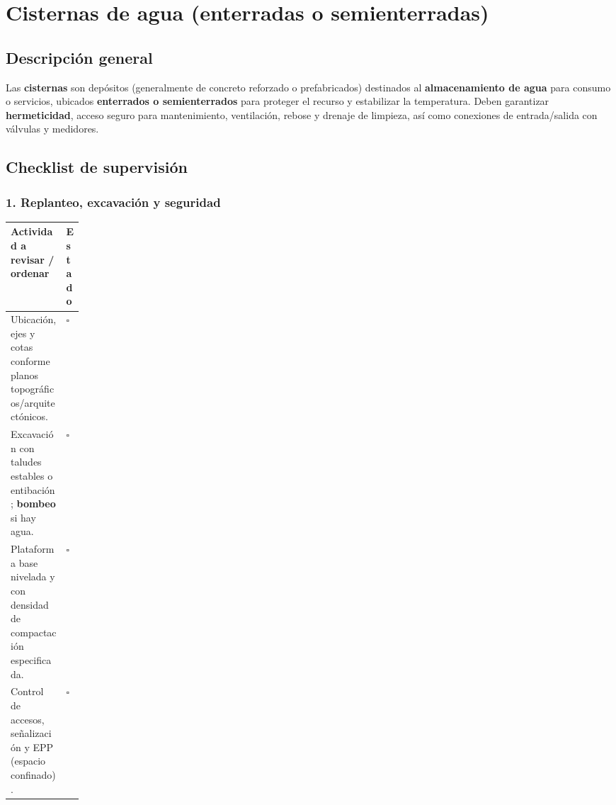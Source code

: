 \documentclass[12pt]{article}
\newcommand{\cbox}{\(\square\)} %
\begin{document}
	
	
	
	
	
	\section{Cisternas de agua (enterradas o semienterradas)}
	
	\subsection*{Descripción general}
	Las \textbf{cisternas} son depósitos (generalmente de concreto reforzado o prefabricados) destinados al \textbf{almacenamiento de agua} para consumo o servicios, ubicados \textbf{enterrados o semienterrados} para proteger el recurso y estabilizar la temperatura. Deben garantizar \textbf{hermeticidad}, acceso seguro para mantenimiento, ventilación, rebose y drenaje de limpieza, así como conexiones de entrada/salida con válvulas y medidores.
	
	
	
	\subsection{Checklist de supervisión}
	
	\renewcommand{\arraystretch}{1.2}
	\small
	
	\subsubsection*{1. Replanteo, excavación y seguridad}
	\begin{tabularx}{\linewidth}{
			>{\raggedright\arraybackslash}X
			>{\centering\arraybackslash}p{0.12\linewidth}
		}
		\toprule
		\textbf{Actividad a revisar / ordenar} & \textbf{Estado}\\
		\midrule
		Ubicación, ejes y cotas conforme planos topográficos/arquitectónicos. & \cbox \\
		Excavación con taludes estables o entibación; \textbf{bombeo} si hay agua. & \cbox \\
		Plataforma base nivelada y con densidad de compactación especificada. & \cbox \\
		Control de accesos, señalización y EPP (espacio confinado). & \cbox \\
		\bottomrule
	\end{tabularx}
	
\end{document}
